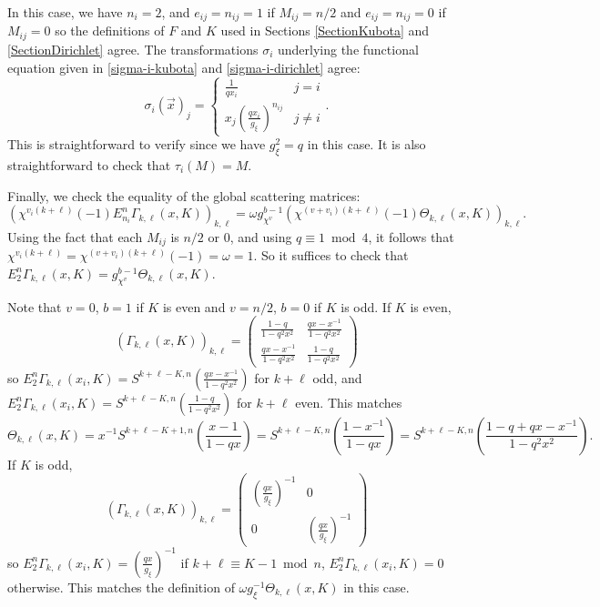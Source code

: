 \documentclass[11pt,letterpaper]{article}
\theoremstyle{definition}
\theoremstyle{remark}
\numberwithin{equation}{section}
\theoremstyle{dotless}
\begin{document}
In this case, we have $n_i=2$, and $e_{ij}=n_{ij}=1$ if $M_{ij}=n/2$ and $e_{ij}=n_{ij}=0$ if $M_{ij}=0$ so the definitions of $F$ and $K$ used in Sections \ref{SectionKubota} and \ref{SectionDirichlet} agree. The transformations $\sigma_i$ underlying the functional equation given in \eqref{sigma-i-kubota} and \eqref{sigma-i-dirichlet} agree:
\begin{equation*} 
\sigma_i(\vec{x})_j = \left\lbrace \begin{array}{cc} 
\frac{1}{qx_i} & j=i \\
x_j\left(\frac{q x_i}{g_\xi}\right)^{n_{ij}} & j \neq i \end{array} \right. .
\end{equation*}
This is straightforward to verify since we have $g_\xi^2=q$ in this case. It is also straightforward to check that $\tau_i(M)=M$. 

Finally, we check the equality of the global scattering matrices:
\begin{equation*}
\left( \chi^{v_i (k+\ell)}(-1) E_{n_i}^n \Gamma_{k, \ell}(x, K) \right)_{k, \ell} = \omega g_{\chi^v}^{b-1}\left(\chi^{(v+v_i)(k+\ell)}(-1)\Theta_{k, \ell}(x, K) \right)_{k, \ell}.
\end{equation*}
Using the fact that each $M_{ij}$ is $n/2$ or $0$, and using $q\equiv 1 \bmod 4$, it follows that $\chi^{v_i(k+\ell)}=\chi^{(v+v_i)(k+\ell)}(-1)=\omega=1$. So it suffices to check that $E_{2}^n \Gamma_{k, \ell}(x, K) = g_{\chi^v}^{b-1} \Theta_{k, \ell}(x, K)$. 

Note that $v=0$, $b=1$ if $K$ is even and $v=n/2$, $b=0$ if $K$ is odd. If $K$ is even,
\begin{equation*}
(\Gamma_{k, \ell}(x, K))_{k, \ell} = \begin{pmatrix}
    \frac{1-q}{1-q^2x^2} & \frac{qx-x^{-1}}{1-q^2x^2} \\\frac{qx-x^{-1}}{1-q^2x^2} & \frac{1-q}{1-q^2x^2}
\end{pmatrix}
\end{equation*}
so $E_{2}^n \Gamma_{k, \ell}(x_i, K) = S^{k+\ell-K, n} \left(\frac{qx-x^{-1}}{1-q^2x^2}\right)$ for $k+\ell$ odd, and $E_{2}^n \Gamma_{k, \ell}(x_i, K) = S^{k+\ell-K, n} \left(\frac{1-q}{1-q^2x^2} \right)$ for $k+\ell$ even. This matches 
\begin{equation*}
    \Theta_{k, \ell}(x, K)=x^{-1} S^{k + \ell-K+1, n} \left( \frac{x-1}{1-qx}\right) = S^{k + \ell-K, n} \left(\frac{1-x^{-1}}{1-qx} \right)= S^{k + \ell-K, n} \left(\frac{1-q+qx-x^{-1}}{1-q^2x^2} \right).
\end{equation*}
If $K$ is odd, 
\begin{equation*}
(\Gamma_{k, \ell}(x, K))_{k, \ell} = \begin{pmatrix}
    \left(\frac{qx}{g_\xi} \right)^{-1} & 0 \\ 0 & \left(\frac{qx}{g_\xi} \right)^{-1}
\end{pmatrix}
\end{equation*}
so $E_{2}^n \Gamma_{k, \ell}(x_i, K) = \left(\frac{qx}{g_\xi} \right)^{-1}$ if $k+\ell\equiv K-1 \bmod n$, $E_{2}^n \Gamma_{k, \ell}(x_i, K) = 0$ otherwise. This matches the definition of $\omega g_{\xi}^{-1} \Theta_{k, \ell}(x, K)$ in this case. 
\end{document}
